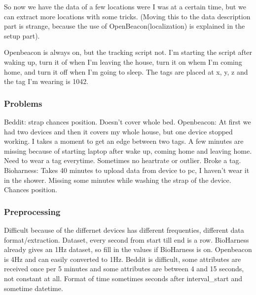 				
				So now we have the data of a few locations were I was at a certain time, but we can extract more locations with some tricks. (Moving this to the data description part is strange, because the use of OpenBeacon(localization) is explained in the setup part).




				
				



				Openbeacon is always on, but the tracking script not. I'm starting the script after waking up, turn it of when I'm leaving the house, turn it on whem I'm coming home, and turn it off when I'm going to sleep. The tags are placed at x, y, z and the tag I'm wearing is 1042. 
		\subsubsection{Problems}
			Beddit: strap chances position. Doesn't cover whole bed. 
			Openbeacon: At first we had two devices and then it covers my whole house, but one device stopped working. I takes a moment to get an edge between two tags. A few minutes are missing because of starting laptop after wake up, coming home and leaving home. Need to wear a tag everytime. Sometimes no heartrate or outlier. Broke a tag.
			Bioharness: Takes 40 minutes to upload data from device to pc, I haven't wear it in the shower. Missing some minutes while washing the strap of the device. Chances position. 
		\subsubsection{Preprocessing}
			Difficult because of the differnet devices has different frequenties, different data format/extraction. 
			Dataset, every second from start till end is a row. BioHarness already gives an 1Hz dataset, so fill in the values if BioHarness is on. 
			Openbeacon is 4Hz and can easily converted to 1Hz.
			Beddit is difficult, some attributes are received once per 5 minutes and some attributes are between 4 and 15 seconds, not constant at all. Format of time sometimes seconds after interval\_start and sometime datetime.
		

